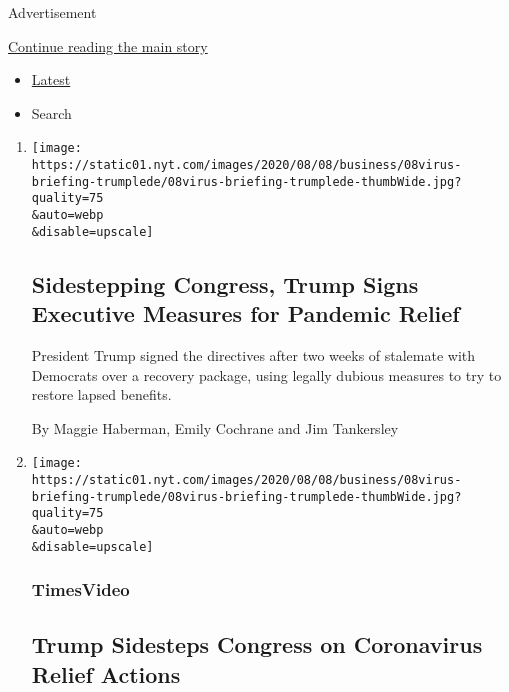 Advertisement

\protect\hyperlink{after-mid1}{Continue reading the main story}

\begin{itemize}
\tightlist
\item
  \protect\hyperlink{stream-panel}{Latest}
\item
  Search
\end{itemize}

\begin{enumerate}
\def\labelenumi{\arabic{enumi}.}
\item
  \href{/2020/08/08/us/politics/trump-stimulus-bill-coronavirus.html}{}

  \texttt{[image: https://static01.nyt.com/images/2020/08/08/business/08virus-briefing-trumplede/08virus-briefing-trumplede-thumbWide.jpg?quality=75\\\&auto=webp\\\&disable=upscale]}

  \hypertarget{sidestepping-congress-trump-signs-executive-measures-for-pandemic-relief}{%
  \subsection{Sidestepping Congress, Trump Signs Executive Measures for
  Pandemic
  Relief}\label{sidestepping-congress-trump-signs-executive-measures-for-pandemic-relief}}

  President Trump signed the directives after two weeks of stalemate
  with Democrats over a recovery package, using legally dubious measures
  to try to restore lapsed benefits.

  By Maggie Haberman, Emily Cochrane and Jim Tankersley
\item
  \href{/video/us/politics/100000007279838/trump-coronavirus-relief-order.html}{}

  \texttt{[image: https://static01.nyt.com/images/2020/08/08/business/08virus-briefing-trumplede/08virus-briefing-trumplede-thumbWide.jpg?quality=75\\\&auto=webp\\\&disable=upscale]}

  \hypertarget{timesvideo}{%
  \subsubsection{TimesVideo}\label{timesvideo}}

  \hypertarget{trump-sidesteps-congress-on-coronavirus-relief-actions}{%
  \subsection{Trump Sidesteps Congress on Coronavirus Relief
  Actions}\label{trump-sidesteps-congress-on-coronavirus-relief-actions}}


\end{enumerate}
